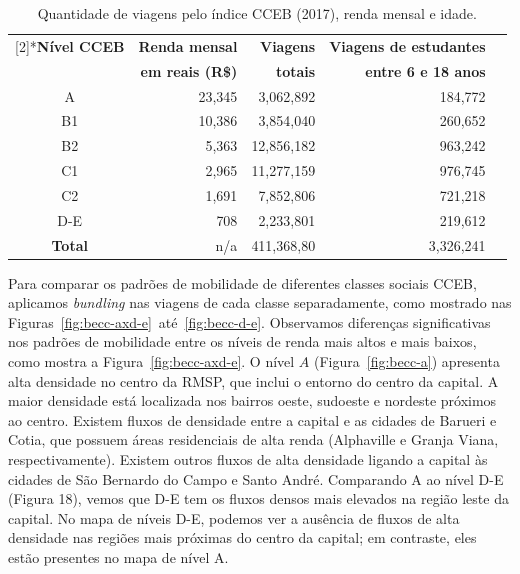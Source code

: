 \begin{table}[!htb]
  \small
  \newcommand{\hdr}[1]{\bfseries#1}
  \centering
  \caption{Quantidade de viagens pelo índice CCEB (2017), renda mensal e idade. \label{tab:becc}}
  \begin{tabular}{>{\footnotesize}c>{\footnotesize}r>{\footnotesize}r>{\footnotesize}r>{\footnotesize}r}
    \toprule
    \multirow{2}[2]{*}{\hdr{Nível CCEB}} & \hdr{Renda mensal} & \hdr{Viagens} & \hdr{Viagens de estudantes}\\
    & \hdr{em reais (R\$)} & \hdr{totais} & \hdr{entre 6 e 18 anos}\\
    \midrule
    A   & 23,345    & 3,062,892  &   184,772\\
    B1  & 10,386    & 3,854,040  &   260,652\\
    B2  & 5,363     & 12,856,182 &   963,242\\
    C1  & 2,965     & 11,277,159 &   976,745\\
    C2  & 1,691     & 7,852,806  &   721,218\\
    D-E & 708       & 2,233,801  &   219,612\\
    \textbf{Total}& n/a & 411,368,80 &  3,326,241\\
    \bottomrule
  \end{tabular}
\end{table}

Para comparar os padrões de mobilidade de diferentes classes sociais CCEB,
aplicamos \emph{bundling} nas viagens de cada classe separadamente, como
mostrado nas Figuras~\ref{fig:becc-axd-e}~até~\ref{fig:becc-d-e}. Observamos
diferenças significativas nos padrões de mobilidade entre os níveis de renda
mais altos e mais baixos, como mostra a Figura~\ref{fig:becc-axd-e}. O nível $A$
(Figura~\ref{fig:becc-a}) apresenta alta densidade no centro da RMSP, que inclui
o entorno do centro da capital. A maior densidade está localizada nos bairros
oeste, sudoeste e nordeste próximos ao centro. Existem fluxos de densidade entre
a capital e as cidades de Barueri e Cotia, que possuem áreas residenciais de
alta renda (Alphaville e Granja Viana, respectivamente). Existem outros fluxos de alta densidade ligando a capital às cidades
de São Bernardo do Campo e Santo André. Comparando A ao nível D-E (Figura 18),
vemos que D-E tem os fluxos densos mais elevados na região leste da capital. No
mapa de níveis D-E, podemos ver a ausência de fluxos de alta densidade nas
regiões mais próximas do centro da capital; em contraste, eles estão presentes
no mapa de nível A.

